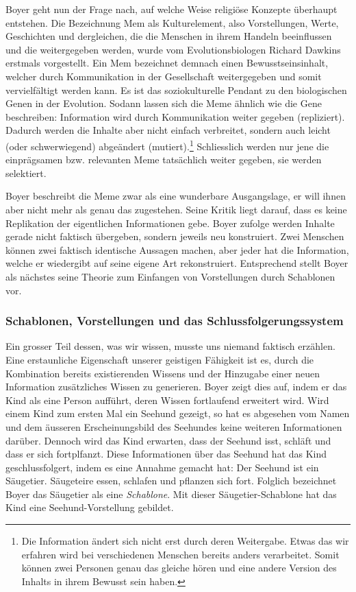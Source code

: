 Boyer geht nun der Frage nach, auf welche Weise religiöse Konzepte überhaupt entstehen. Die Bezeichnung Mem als Kulturelement, also Vorstellungen, Werte, Geschichten und dergleichen, die die Menschen in ihrem Handeln beeinflussen und die weitergegeben werden, wurde vom Evolutionsbiologen Richard Dawkins erstmals vorgestellt. Ein Mem bezeichnet demnach einen Bewusstseinsinhalt, welcher durch Kommunikation in der Gesellschaft weitergegeben und somit vervielfältigt werden kann. Es ist das soziokulturelle Pendant zu den biologischen Genen in der Evolution. Sodann lassen sich die Meme ähnlich wie die Gene beschreiben: Information wird durch Kommunikation weiter gegeben (repliziert). Dadurch werden die Inhalte aber nicht einfach verbreitet, sondern auch leicht (oder schwerwiegend) abgeändert (mutiert).\footnote{Die Information ändert sich nicht erst durch deren Weitergabe. Etwas das wir erfahren wird bei verschiedenen Menschen bereits anders verarbeitet. Somit können zwei Personen genau das gleiche hören und eine andere Version des Inhalts in ihrem Bewusst sein haben.} Schliesslich werden nur jene die einprägsamen bzw. relevanten Meme tatsächlich weiter gegeben, sie werden selektiert.

Boyer beschreibt die Meme zwar als eine wunderbare Ausgangslage, er will ihnen aber nicht mehr als genau das zugestehen. Seine Kritik liegt darauf, dass es keine Replikation der eigentlichen Informationen gebe. Boyer zufolge werden Inhalte gerade nicht faktisch übergeben, sondern jeweils neu konstruiert. Zwei Menschen können zwei faktisch identische Aussagen machen, aber jeder hat die Information, welche er wiedergibt auf seine eigene Art rekonstruiert. Entsprechend stellt Boyer als nächstes seine Theorie zum Einfangen von Vorstellungen durch Schablonen vor.

\subsubsection{Schablonen, Vorstellungen und das Schlussfolgerungssystem}
Ein grosser Teil dessen, was wir wissen, musste uns niemand faktisch erzählen. Eine erstaunliche Eigenschaft unserer geistigen Fähigkeit ist es, durch die Kombination bereits existierenden Wissens und der Hinzugabe einer neuen Information zusätzliches Wissen zu generieren. Boyer zeigt dies auf, indem er das Kind als eine Person aufführt, deren Wissen fortlaufend erweitert wird. Wird einem Kind zum ersten Mal ein Seehund gezeigt, so hat es abgesehen vom Namen und dem äusseren Erscheinungsbild des Seehundes keine weiteren Informationen darüber. Dennoch wird das Kind erwarten, dass der Seehund isst, schläft und dass er sich fortplfanzt. Diese Informationen über das Seehund hat das Kind geschlussfolgert, indem es eine Annahme gemacht hat: Der Seehund ist ein Säugetier. Säugeteire essen, schlafen und pflanzen sich fort. Folglich bezeichnet Boyer das Säugetier als eine \emph{Schablone}. Mit dieser Säugetier-Schablone hat das Kind eine Seehund-Vorstellung gebildet. 

